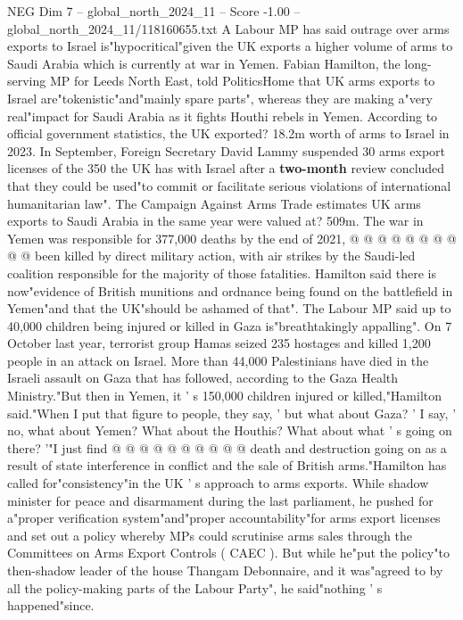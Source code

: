 \begin{textsample}{NEG Dim 7 – global\_north\_2024\_11 – Score -1.00 – global\_north\_2024\_11/118160655.txt}  \label{ex:f7_neg_337}
A Labour MP has said outrage over arms exports to Israel is"hypocritical"given the UK exports a higher volume of arms to Saudi Arabia which is currently at war in Yemen.
Fabian Hamilton, the long-serving MP for Leeds North East, told PoliticsHome that UK arms exports to Israel are"tokenistic"and"mainly spare parts", whereas they are making a"very real"impact for Saudi Arabia as it fights Houthi rebels in Yemen.
According to official government statistics, the UK exported? 18.2m worth of arms to Israel in 2023.
In September, Foreign Secretary David Lammy suspended 30 arms export licenses of the 350 the UK has with Israel after a \textbf{two-month} review concluded that they could be used"to commit or facilitate serious violations of international humanitarian law".
The Campaign Against Arms Trade estimates UK arms exports to Saudi Arabia in the same year were valued at? 509m.
The war in Yemen was responsible for 377,000 deaths by the end of 2021, @ @ @ @ @ @ @ @ @ @ been killed by direct military action, with air strikes by the Saudi-led coalition responsible for the majority of those fatalities.
Hamilton said there is now"evidence of British munitions and ordnance being found on the battlefield in Yemen"and that the UK"should be ashamed of that".
The Labour MP said up to 40,000 children being injured or killed in Gaza is"breathtakingly appalling".
On 7 October last year, terrorist group Hamas seized 235 hostages and killed 1,200 people in an attack on Israel.
More than 44,000 Palestinians have died in the Israeli assault on Gaza that has followed, according to the Gaza Health Ministry."But then in Yemen, it ' s 150,000 children injured or killed,"Hamilton said."When I put that figure to people, they say, ' but what about Gaza? ' I say, ' no, what about Yemen?
What about the Houthis?
What about what ' s going on there? '"I just find @ @ @ @ @ @ @ @ @ @ death and destruction going on as a result of state interference in conflict and the sale of British arms."Hamilton has called for"consistency"in the UK ' s approach to arms exports.
While shadow minister for peace and disarmament during the last parliament, he pushed for a"proper verification system"and"proper accountability"for arms export licenses and set out a policy whereby MPs could scrutinise arms sales through the Committees on Arms Export Controls ( CAEC ).
But while he"put the policy"to then-shadow leader of the house Thangam Debonnaire, and it was"agreed to by all the policy-making parts of the Labour Party", he said"nothing ' s happened"since.

\end{textsample}
